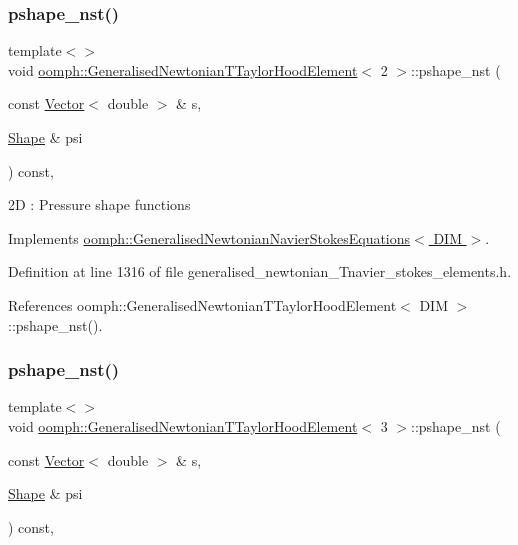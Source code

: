 \subsubsection{\texorpdfstring{pshape\+\_\+nst()}{pshape\_nst()}\hspace{0.1cm}{\footnotesize\ttfamily [3/4]}}
{\footnotesize\ttfamily template$<$$>$ \\
void \hyperlink{classoomph_1_1GeneralisedNewtonianTTaylorHoodElement}{oomph\+::\+Generalised\+Newtonian\+T\+Taylor\+Hood\+Element}$<$ 2 $>$\+::pshape\+\_\+nst (\begin{DoxyParamCaption}\item[{const \hyperlink{classoomph_1_1Vector}{Vector}$<$ double $>$ \&}]{s,  }\item[{\hyperlink{classoomph_1_1Shape}{Shape} \&}]{psi }\end{DoxyParamCaption}) const\hspace{0.3cm}{\ttfamily [inline]}, {\ttfamily [virtual]}}

2D \+: Pressure shape functions 

Implements \hyperlink{classoomph_1_1GeneralisedNewtonianNavierStokesEquations_a84735d21f3d1ade819726a71a7b462e1}{oomph\+::\+Generalised\+Newtonian\+Navier\+Stokes\+Equations$<$ D\+I\+M $>$}.



Definition at line 1316 of file generalised\+\_\+newtonian\+\_\+\+Tnavier\+\_\+stokes\+\_\+elements.\+h.



References oomph\+::\+Generalised\+Newtonian\+T\+Taylor\+Hood\+Element$<$ D\+I\+M $>$\+::pshape\+\_\+nst().

\mbox{\label{classoomph_1_1GeneralisedNewtonianTTaylorHoodElement_a3cbce3dea76f7e894bbd6a67c5c4d25c}} 
\subsubsection{\texorpdfstring{pshape\+\_\+nst()}{pshape\_nst()}\hspace{0.1cm}{\footnotesize\ttfamily [4/4]}}
{\footnotesize\ttfamily template$<$$>$ \\
void \hyperlink{classoomph_1_1GeneralisedNewtonianTTaylorHoodElement}{oomph\+::\+Generalised\+Newtonian\+T\+Taylor\+Hood\+Element}$<$ 3 $>$\+::pshape\+\_\+nst (\begin{DoxyParamCaption}\item[{const \hyperlink{classoomph_1_1Vector}{Vector}$<$ double $>$ \&}]{s,  }\item[{\hyperlink{classoomph_1_1Shape}{Shape} \&}]{psi }\end{DoxyParamCaption}) const\hspace{0.3cm}{\ttfamily [inline]}, {\ttfamily [virtual]}}

